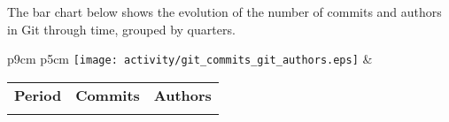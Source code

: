 The bar chart below shows the evolution of the number of commits and authors in Git through time, grouped by quarters.

\begin{tabular}{p{9cm} p{5cm}}
	\vspace{0pt} 
	\hspace*{-6cm}  
	\texttt{[image: activity/git\_commits\_git\_authors.eps]}
	& 
	\vspace{0pt}
	\begin{tabular}{l|r|r|}
		\bfseries Period & \bfseries Commits & \bfseries Authors
		\csvreader[head to column names]{activity/git_commits_git_authors.csv}{}
		{\\\Date & \commits & \authors}
	\end{tabular}
\end{tabular}



